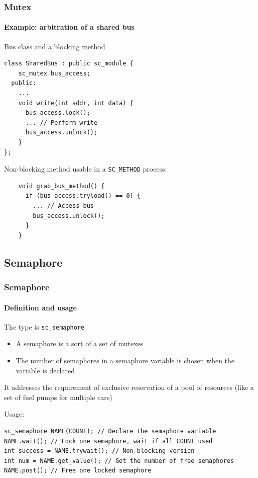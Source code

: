 \begin{frame}[fragile]
\frametitle{Mutex}
\framesubtitle{Example: arbitration of a shared bus}
\begin{block}{Bus class and a blocking method}
\vspace{-1em}
{\scriptsize 
\begin{verbatim}
class SharedBus : public sc_module {
    sc_mutex bus_access;
  public: 
    ...
    void write(int addr, int data) {
      bus_access.lock();
      ... // Perform write
      bus_access.unlock();
    }
};
\end{verbatim}
}
\vspace{-1em}
\end{block}

\begin{block}{Non-blocking method usable in a \texttt{SC\_METHOD} process:}
\vspace{-1em}
{\scriptsize 
\begin{verbatim}
    void grab_bus_method() {
      if (bus_access.tryload() == 0) {
        ... // Access bus
        bus_access.unlock();
      }
    }
\end{verbatim}
}
\vspace{-1em}
\end{block}

\end{frame}

\subsection{Semaphore}

\begin{frame}[fragile]
\frametitle{Semaphore}
\framesubtitle{Definition and usage}

\begin{block}{The type is \texttt{sc\_semaphore}}
\begin{itemize}
\item A semaphore is a sort of a set of mutexes
\item The number of semaphores in a semaphore variable is chosen when the variable is declared
\end{itemize}
It addresses the requirement of exclusive reservation of a pool of resources (like a set of fuel pumps for multiple cars)
\end{block}
\pause
\begin{block}{Usage:}
\vspace{-1em}
{\scriptsize 
\begin{verbatim}
sc_semaphore NAME(COUNT); // Declare the semaphore variable
NAME.wait(); // Lock one semaphore, wait if all COUNT used
int success = NAME.trywait(); // Non-blocking version
int num = NAME.get_value(); // Get the number of free semaphores
NAME.post(); // Free one locked semaphore
\end{verbatim}
}
\vspace{-1em}
\end{block}
\end{frame}

